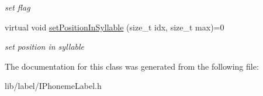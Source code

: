 \begin{DoxyCompactItemize}
\begin{DoxyCompactList}\small\item\em set flag \end{DoxyCompactList}\item 
\hypertarget{classsinsy_1_1IPhonemeLabel_a37f8e6ee77544d4e1b29c3161a3da1aa}{virtual void \hyperlink{classsinsy_1_1IPhonemeLabel_a37f8e6ee77544d4e1b29c3161a3da1aa}{set\-Position\-In\-Syllable} (size\-\_\-t idx, size\-\_\-t max)=0}\label{classsinsy_1_1IPhonemeLabel_a37f8e6ee77544d4e1b29c3161a3da1aa}

\begin{DoxyCompactList}\small\item\em set position in syllable \end{DoxyCompactList}\end{DoxyCompactItemize}


\-The documentation for this class was generated from the following file\-:\begin{DoxyCompactItemize}
\item 
lib/label/\-I\-Phoneme\-Label.\-h\end{DoxyCompactItemize}
